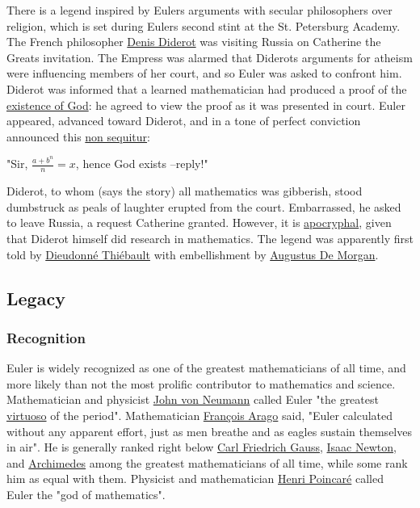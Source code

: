 There is a legend inspired by Euler\textquotesingle s arguments with secular philosophers over religion, which is set during Euler\textquotesingle s second stint at the St. Petersburg Academy. The French philosopher \href{https://en.wikipedia.org/wiki/Denis_Diderot}{Denis Diderot} was visiting Russia on Catherine the Great\textquotesingle s invitation. The Empress was alarmed that Diderot\textquotesingle s arguments for atheism were influencing members of her court, and so Euler was asked to confront him. Diderot was informed that a learned mathematician had produced a proof of the \href{https://en.wikipedia.org/wiki/Existence_of_God}{existence of God}: he agreed to view the proof as it was presented in court. Euler appeared, advanced toward Diderot, and in a tone of perfect conviction announced this \href{https://en.wikipedia.org/wiki/Non_sequitur_(literary_device)}{non sequitur}:

"Sir, {{\(\frac{a + b^{n}}{n} = x\)}{}}, hence God exists --reply!"

Diderot, to whom (says the story) all mathematics was gibberish, stood dumbstruck as peals of laughter erupted from the court. Embarrassed, he asked to leave Russia, a request Catherine granted. However, it is \href{https://en.wiktionary.org/wiki/apocryphal}{apocryphal}, given that Diderot himself did research in mathematics.
The legend was apparently first told by \href{https://en.wikipedia.org/wiki/Dieudonné_Thiébault}{Dieudonné Thiébault} with embellishment by \href{https://en.wikipedia.org/wiki/Augustus_De_Morgan}{Augustus De Morgan}.


\subsection{Legacy}\label{Legacy}


\subsubsection{Recognition}\label{Recognition}

Euler is widely recognized as one of the greatest mathematicians of all time, and more likely than not the most prolific contributor to mathematics and science. Mathematician and physicist \href{https://en.wikipedia.org/wiki/John_von_Neumann}{John von Neumann} called Euler "the greatest \href{https://en.wikipedia.org/wiki/Virtuoso}{virtuoso} of the period". Mathematician \href{https://en.wikipedia.org/wiki/François_Arago}{François Arago} said, "Euler calculated without any apparent effort, just as men breathe and as eagles sustain themselves in air". He is generally ranked right below \href{https://en.wikipedia.org/wiki/Carl_Friedrich_Gauss}{Carl Friedrich Gauss}, \href{https://en.wikipedia.org/wiki/Isaac_Newton}{Isaac Newton}, and \href{https://en.wikipedia.org/wiki/Archimedes}{Archimedes} among the greatest mathematicians of all time, while some rank him as equal with them. Physicist and mathematician \href{https://en.wikipedia.org/wiki/Henri_Poincaré}{Henri Poincaré} called Euler the "god of mathematics".

